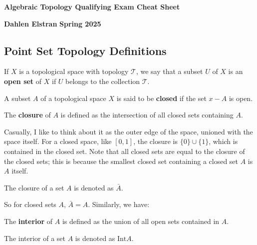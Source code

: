 \documentclass[12pt]{article}
\begin{document}
\begin{newtitle}
  \begin{center}
    \textbf{\Huge Algebraic Topology Qualifying Exam Cheat Sheet}
  \end{center}
  \textbf{Dahlen Elstran} \hfill \textbf{Spring 2025}
\end{newtitle}

\begin{center} \section*{Point Set Topology Definitions} \end{center}

\begin{definition}
  If $X$ is a topological space with topology $\mathcal{T}$, we say that a subset $U$ of $X$ 
  is an \textbf{open set} of $X$ if $U$ belongs to the collection $\mathcal{T}$.
\end{definition}

\begin{definition}
  A subset $A$ of a topological space $X$ is said to be \textbf{closed} if the set $x - A$ is open.
\end{definition}

\begin{definition}
  The \textbf{closure} of $A$ is defined as the intersection of all closed sets containing $A$.
\end{definition}

Casually, I like to think about it as the outer edge of the space, unioned with the space itself. For a closed space, like $[0,1]$, 
the closure is $\{0\} \cup \{1\}$, which is contained in the closed set. Note that all closed sets are equal to the closure of the
closed sets; this is because the smallest closed set containing a closed set $A$ is $A$ itself. 

\begin{notation}
  The closure of a set $A$ is denoted as $\bar{A}$.
\end{notation}

So for closed sets $A$, $\bar{A} = A$. Similarly, we have:

\begin{definition}
  The \textbf{interior} of $A$ is defined as the union of all open sets contained in $A$.
\end{definition}

\begin{notation}
  The interior of a set $A$ is denoted as $\text{Int} A$.
\end{notation}
\end{document}
